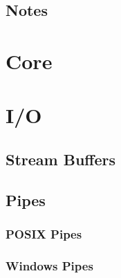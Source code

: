 \documentclass[11pt,a4paper]{mudbook}
\begin{document}

\chapter{Notes}


\part{Core}


\part{I/O}


\chapter{Stream Buffers}


\chapter{Pipes}

\section{POSIX Pipes}

\section{Windows Pipes}

\end{document}
